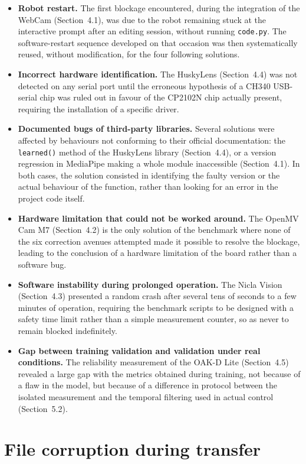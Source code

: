 \documentclass[12pt,a4paper]{report}
\begin{document}
	\begin{itemize}
		\item \textbf{Robot restart.} The first blockage encountered, during the integration of the WebCam (Section~4.1), was due to the robot remaining stuck at the interactive prompt after an editing session, without running \texttt{code.py}. The software-restart sequence developed on that occasion was then systematically reused, without modification, for the four following solutions.
		\item \textbf{Incorrect hardware identification.} The HuskyLens (Section~4.4) was not detected on any serial port until the erroneous hypothesis of a CH340 USB-serial chip was ruled out in favour of the CP2102N chip actually present, requiring the installation of a specific driver.
		\item \textbf{Documented bugs of third-party libraries.} Several solutions were affected by behaviours not conforming to their official documentation: the \texttt{learned()} method of the HuskyLens library (Section~4.4), or a version regression in MediaPipe making a whole module inaccessible (Section~4.1). In both cases, the solution consisted in identifying the faulty version or the actual behaviour of the function, rather than looking for an error in the project code itself.
		\item \textbf{Hardware limitation that could not be worked around.} The OpenMV Cam M7 (Section~4.2) is the only solution of the benchmark where none of the six correction avenues attempted made it possible to resolve the blockage, leading to the conclusion of a hardware limitation of the board rather than a software bug.
		\item \textbf{Software instability during prolonged operation.} The Nicla Vision (Section~4.3) presented a random crash after several tens of seconds to a few minutes of operation, requiring the benchmark scripts to be designed with a safety time limit rather than a simple measurement counter, so as never to remain blocked indefinitely.
		\item \textbf{Gap between training validation and validation under real conditions.} The reliability measurement of the OAK-D Lite (Section~4.5) revealed a large gap with the metrics obtained during training, not because of a flaw in the model, but because of a difference in protocol between the isolated measurement and the temporal filtering used in actual control (Section~5.2).
	\end{itemize}
	
	\section*{File corruption during transfer}
	
\end{document}
